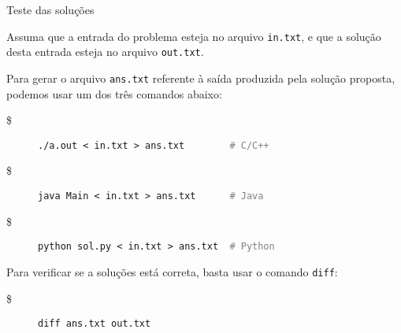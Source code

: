 \begin{frame}[fragile]{Teste das soluções}

    Assuma que a entrada do problema esteja no arquivo \texttt{in.txt}, e que a solução desta
    entrada esteja no arquivo \texttt{out.txt}.

    Para gerar o arquivo \texttt{ans.txt} referente à saída produzida pela solução proposta,
    podemos usar um dos três comandos abaixo:

    \begin{description}
        \item[\$] \texttt{./a.out < in.txt > ans.txt  \textcolor{gray}{\ \ \ \ \ \ \  \# C/C++}}
        \item[\$] \texttt{java Main < in.txt > ans.txt  \textcolor{gray}{\ \ \ \ \ \# Java}}
        \item[\$] \texttt{python sol.py < in.txt > ans.txt  \textcolor{gray}{\ \# Python}}
    \end{description}

    Para verificar se a soluções está correta, basta usar o comando \texttt{diff}:

    \begin{description}
        \item[\$] \texttt{diff ans.txt out.txt}
    \end{description}

\end{frame}
